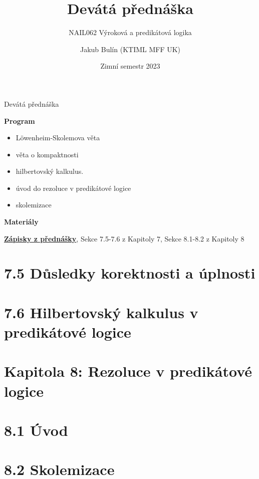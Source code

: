 \documentclass{beamer}
\title{Devátá přednáška}
\subtitle{NAIL062 Výroková a predikátová logika}
\author{Jakub Bulín (KTIML MFF UK)}
\date{Zimní semestr 2023}
\begin{document}
\frame{\titlepage}


\begin{frame}{Devátá přednáška}

    \textbf{Program}
        \begin{itemize}
            \item Löwenheim-Skolemova věta
            \item věta o kompaktnosti
            \item hilbertovský kalkulus.
            \item úvod do rezoluce v predikátové logice
            \item skolemizace
        \end{itemize}

    \textbf{Materiály}

        \href{https://github.com/jbulin-mff-uk/nail062/raw/main/lecture/lecture-notes/lecture-notes.pdf}{\alert{\textbf{Zápisky z přednášky}}}, Sekce 7.5-7.6 z Kapitoly 7, Sekce 8.1-8.2 z Kapitoly 8

\end{frame}


\section{7.5 Důsledky korektnosti a úplnosti}


\section{7.6 Hilbertovský kalkulus v predikátové logice}


\section{\sc Kapitola 8: Rezoluce v predikátové logice}


\section{8.1 Úvod}


\section{8.2 Skolemizace}
\end{document}
